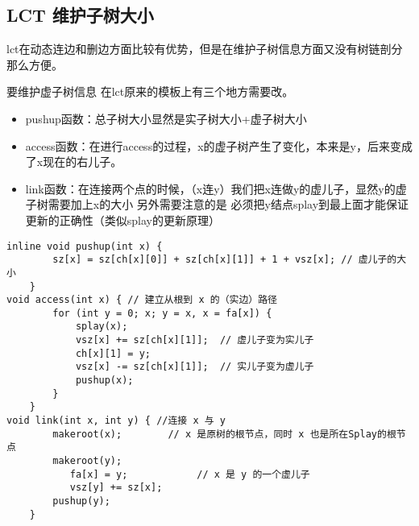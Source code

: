 \subsection{LCT 维护子树大小}
\par \noindent lct在动态连边和删边方面比较有优势，但是在维护子树信息方面又没有树链剖分那么方便。

\par \noindent 要维护虚子树信息 在lct原来的模板上有三个地方需要改。

\begin{itemize}
\item pushup函数：总子树大小显然是实子树大小+虚子树大小
\item access函数：在进行access的过程，x的虚子树产生了变化，本来是y，后来变成了x现在的右儿子。
\item link函数：在连接两个点的时候，（x连y）我们把x连做y的虚儿子，显然y的虚子树需要加上x的大小 另外需要注意的是 必须把y结点splay到最上面才能保证更新的正确性（类似splay的更新原理）
\end{itemize}
\begin{verbatim}
inline void pushup(int x) {
        sz[x] = sz[ch[x][0]] + sz[ch[x][1]] + 1 + vsz[x]; // 虚儿子的大小
    }
void access(int x) { // 建立从根到 x 的（实边）路径
        for (int y = 0; x; y = x, x = fa[x]) {
            splay(x);
            vsz[x] += sz[ch[x][1]];  // 虚儿子变为实儿子
            ch[x][1] = y;
            vsz[x] -= sz[ch[x][1]];  // 实儿子变为虚儿子
            pushup(x);
        }
    }
void link(int x, int y) { //连接 x 与 y
        makeroot(x);        // x 是原树的根节点，同时 x 也是所在Splay的根节点        
        makeroot(y);
           fa[x] = y;            // x 是 y 的一个虚儿子
           vsz[y] += sz[x];
        pushup(y);
    }
\end{verbatim}